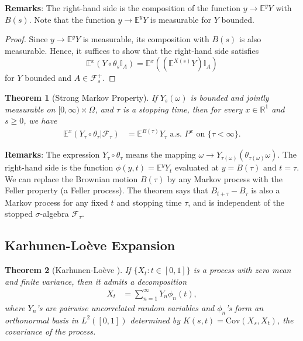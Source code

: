 \documentclass{article}
\theoremstyle{plain}
\newtheorem{theorem}{Theorem}
\theoremstyle{definition}
\begin{document}
\textbf{Remarks}: The right-hand side is the composition of the function $y\rightarrow\mathbb{E}^yY$ with $B(s)$. Note that the function $y\rightarrow\mathbb{E}^yY$ is measurable for $Y$ bounded.

\begin{proof}
Since $y\rightarrow\mathbb{E}^yY$ is measurable, its composition with $B(s)$ is also measurable. Hence, it suffices to show that the right-hand side satisfies 
$$\mathbb{E}^x(Y\circ\theta_s\mathbb{I}_A)=\mathbb{E}^x((\mathbb{E}^{X(s)}Y)\mathbb{I}_A)$$
for $Y$ bounded and $A\in\mathcal{F}_s^+$.
\end{proof}

\begin{theorem}[Strong Markov Property]
If $Y_s(\omega)$ is bounded and jointly measurable on $[0,\infty)\times\Omega$, and $\tau$ is a stopping time, then for every $x\in\mathbb{R}^1$ and $s\ge 0$, we have
\begin{align}
    \mathbb{E}^x(Y_\tau\circ\theta_\tau|\mathcal{F}_\tau)&=\mathbb{E}^{B(\tau)}Y_\tau\text{ a.s. }P^x\text{ on }\{\tau<\infty\}.
\end{align}
\end{theorem}

\textbf{Remarks}: The expression $Y_\tau\circ\theta_\tau$ means the mapping $\omega\rightarrow Y_{\tau(\omega)}(\theta_{\tau(\omega)}\omega)$. The right-hand side is the function $\phi(y,t)=\mathbb{E}^yY_t$ evaluated at $y=B(\tau)$ and $t=\tau$. We can replace the Brownian motion $B(\tau)$ by any Markov process with the Feller property (a Feller process). The theorem says that $B_{t+\tau}-B_\tau$ is also a Markov process for any fixed $t$ and stopping time $\tau$, and is independent of the stopped $\sigma$-algebra $\mathcal{F}_\tau$.

\subsection{Karhunen-Loève Expansion}

\begin{theorem}[Karhunen-Loève \citep{dabrowska2020stochastic}] 
If $\{X_t:t\in[0,1]\}$ is a process with zero mean and finite variance, then it admits a decomposition
\begin{align}
    X_t &= \sum_{n=1}^\infty Y_n\phi_n(t),
\end{align}
where $Y_n$'s are pairwise uncorrelated random variables and $\phi_n$'s form an orthonormal basis in $L^2([0,1])$ determined by $K(s,t) = \text{Cov}(X_s,X_t)$, the covariance of the process.
\end{theorem}
\end{document}
